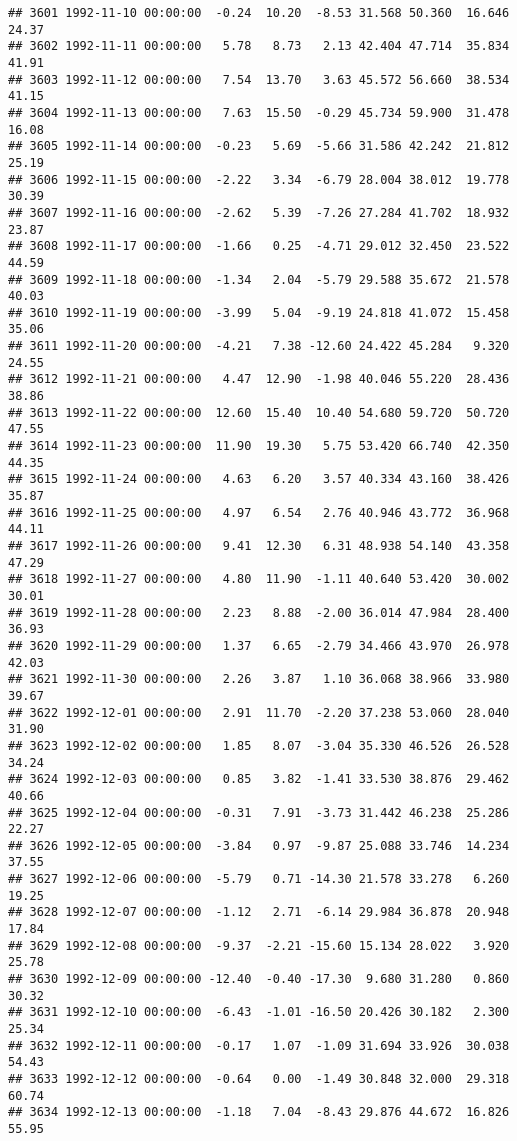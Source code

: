 \documentclass{article}\usepackage{graphicx, color}
\makeatletter
\newenvironment{kframe}{%
 \def\at@end@of@kframe{}%
 \ifinner\ifhmode%
  \def\at@end@of@kframe{\end{minipage}}%
  \begin{minipage}{\columnwidth}%
 \fi\fi%
 \def\FrameCommand##1{\hskip\@totalleftmargin \hskip-\fboxsep
 \colorbox{shadecolor}{##1}\hskip-\fboxsep
     \hskip-\linewidth \hskip-\@totalleftmargin \hskip\columnwidth}%
 \MakeFramed {\advance\hsize-\width
   \@totalleftmargin\z@ \linewidth\hsize
   \@setminipage}}%
 {\par\unskip\endMakeFramed%
 \at@end@of@kframe}
\newenvironment{knitrout}{}{} %
\makeatother
\begin{document}
\begin{knitrout}
\begin{kframe}
\begin{verbatim}
## 3601 1992-11-10 00:00:00  -0.24  10.20  -8.53 31.568 50.360  16.646  24.37
## 3602 1992-11-11 00:00:00   5.78   8.73   2.13 42.404 47.714  35.834  41.91
## 3603 1992-11-12 00:00:00   7.54  13.70   3.63 45.572 56.660  38.534  41.15
## 3604 1992-11-13 00:00:00   7.63  15.50  -0.29 45.734 59.900  31.478  16.08
## 3605 1992-11-14 00:00:00  -0.23   5.69  -5.66 31.586 42.242  21.812  25.19
## 3606 1992-11-15 00:00:00  -2.22   3.34  -6.79 28.004 38.012  19.778  30.39
## 3607 1992-11-16 00:00:00  -2.62   5.39  -7.26 27.284 41.702  18.932  23.87
## 3608 1992-11-17 00:00:00  -1.66   0.25  -4.71 29.012 32.450  23.522  44.59
## 3609 1992-11-18 00:00:00  -1.34   2.04  -5.79 29.588 35.672  21.578  40.03
## 3610 1992-11-19 00:00:00  -3.99   5.04  -9.19 24.818 41.072  15.458  35.06
## 3611 1992-11-20 00:00:00  -4.21   7.38 -12.60 24.422 45.284   9.320  24.55
## 3612 1992-11-21 00:00:00   4.47  12.90  -1.98 40.046 55.220  28.436  38.86
## 3613 1992-11-22 00:00:00  12.60  15.40  10.40 54.680 59.720  50.720  47.55
## 3614 1992-11-23 00:00:00  11.90  19.30   5.75 53.420 66.740  42.350  44.35
## 3615 1992-11-24 00:00:00   4.63   6.20   3.57 40.334 43.160  38.426  35.87
## 3616 1992-11-25 00:00:00   4.97   6.54   2.76 40.946 43.772  36.968  44.11
## 3617 1992-11-26 00:00:00   9.41  12.30   6.31 48.938 54.140  43.358  47.29
## 3618 1992-11-27 00:00:00   4.80  11.90  -1.11 40.640 53.420  30.002  30.01
## 3619 1992-11-28 00:00:00   2.23   8.88  -2.00 36.014 47.984  28.400  36.93
## 3620 1992-11-29 00:00:00   1.37   6.65  -2.79 34.466 43.970  26.978  42.03
## 3621 1992-11-30 00:00:00   2.26   3.87   1.10 36.068 38.966  33.980  39.67
## 3622 1992-12-01 00:00:00   2.91  11.70  -2.20 37.238 53.060  28.040  31.90
## 3623 1992-12-02 00:00:00   1.85   8.07  -3.04 35.330 46.526  26.528  34.24
## 3624 1992-12-03 00:00:00   0.85   3.82  -1.41 33.530 38.876  29.462  40.66
## 3625 1992-12-04 00:00:00  -0.31   7.91  -3.73 31.442 46.238  25.286  22.27
## 3626 1992-12-05 00:00:00  -3.84   0.97  -9.87 25.088 33.746  14.234  37.55
## 3627 1992-12-06 00:00:00  -5.79   0.71 -14.30 21.578 33.278   6.260  19.25
## 3628 1992-12-07 00:00:00  -1.12   2.71  -6.14 29.984 36.878  20.948  17.84
## 3629 1992-12-08 00:00:00  -9.37  -2.21 -15.60 15.134 28.022   3.920  25.78
## 3630 1992-12-09 00:00:00 -12.40  -0.40 -17.30  9.680 31.280   0.860  30.32
## 3631 1992-12-10 00:00:00  -6.43  -1.01 -16.50 20.426 30.182   2.300  25.34
## 3632 1992-12-11 00:00:00  -0.17   1.07  -1.09 31.694 33.926  30.038  54.43
## 3633 1992-12-12 00:00:00  -0.64   0.00  -1.49 30.848 32.000  29.318  60.74
## 3634 1992-12-13 00:00:00  -1.18   7.04  -8.43 29.876 44.672  16.826  55.95

\end{verbatim}
\end{kframe}
\end{knitrout}
\end{document}
